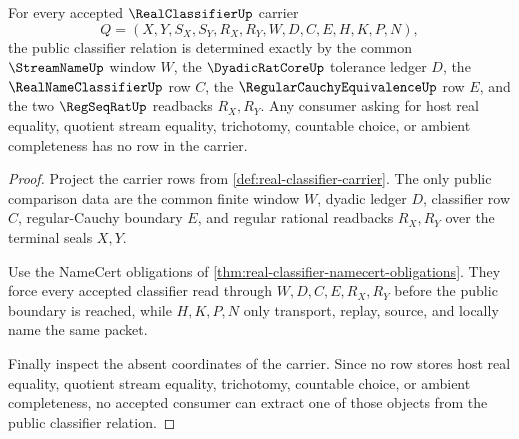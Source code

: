 \begin{theorem}
\label{thm:realclassifier-scaffold-target}
For every accepted $\RealClassifierUp$ carrier
$$
Q=(X,Y,S_X,S_Y,R_X,R_Y,W,D,C,E,H,K,P,N),
$$
the public classifier relation is determined exactly by the common $\StreamNameUp$ window $W$, the $\DyadicRatCoreUp$ tolerance ledger $D$, the $\RealNameClassifierUp$ row $C$, the $\RegularCauchyEquivalenceUp$ row $E$, and the two $\RegSeqRatUp$ readbacks $R_X,R_Y$. Any consumer asking for host real equality, quotient stream equality, trichotomy, countable choice, or ambient completeness has no row in the carrier.
\end{theorem}
\begin{proof}
Project the carrier rows from \autoref{def:real-classifier-carrier}. The only public comparison data are the common finite window $W$, dyadic ledger $D$, classifier row $C$, regular-Cauchy boundary $E$, and regular rational readbacks $R_X,R_Y$ over the terminal seals $X,Y$.

Use the NameCert obligations of \autoref{thm:real-classifier-namecert-obligations}. They force every accepted classifier read through $W,D,C,E,R_X,R_Y$ before the public boundary is reached, while $H,K,P,N$ only transport, replay, source, and locally name the same packet.

Finally inspect the absent coordinates of the carrier. Since no row stores host real equality, quotient stream equality, trichotomy, countable choice, or ambient completeness, no accepted consumer can extract one of those objects from the public classifier relation.
\end{proof}

